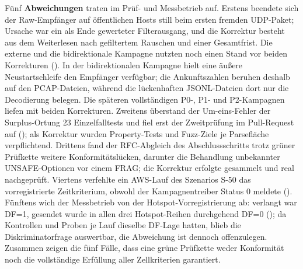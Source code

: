 Fünf \textbf{Abweichungen} traten im Prüf- und Messbetrieb auf. Erstens beendete sich der Raw-Empfänger
auf öffentlichen Hosts still beim ersten fremden UDP-Paket; Ursache war ein als Ende gewerteter
Filterausgang, und die Korrektur besteht aus dem Weiterlesen nach gefiltertem Rauschen und einer
Gesamtfrist.
Die externe und die bidirektionale Kampagne nutzten noch einen Stand vor beiden Korrekturen
(). In der bidirektionalen Kampagne hielt eine
äußere Neustartschleife den Empfänger verfügbar; die Ankunftszahlen beruhen deshalb auf den
PCAP-Dateien, während die lückenhaften JSONL-Dateien dort nur die Decodierung belegen. Die
späteren vollständigen P0-, P1- und P2-Kampagnen liefen mit beiden Korrekturen. Zweitens überstand
der Um-eins-Fehler der Surplus-Ortung 23 Einzelfalltests und fiel erst der Zweitprüfung im Pull-Request
auf (); als Korrektur wurden Property-Tests und Fuzz-Ziele je Parsefläche
verpflichtend.
Drittens fand der RFC-Abgleich des Abschlussschritts trotz grüner Prüfkette weitere Konformitätslücken,
darunter die Behandlung unbekannter UNSAFE-Optionen vor einem FRAG; die Korrektur erfolgte gesammelt
und real nachgeprüft. Viertens verfehlte ein AWS-Lauf des Szenarios S-50 das vorregistrierte
Zeitkriterium, obwohl der Kampagnentreiber Status 0 meldete (). Fünftens
wich der Messbetrieb von der
Hotspot-Vorregistrierung ab: verlangt war DF=1, gesendet wurde in allen drei Hotspot-Reihen durchgehend
DF=0 (); da Kontrollen und Proben je Lauf dieselbe DF-Lage hatten, blieb die
Diskriminatorfrage auswertbar, die Abweichung ist dennoch offenzulegen. Zusammen zeigen die fünf Fälle,
dass eine grüne Prüfkette weder Konformität noch die vollständige Erfüllung aller Zellkriterien
garantiert.

